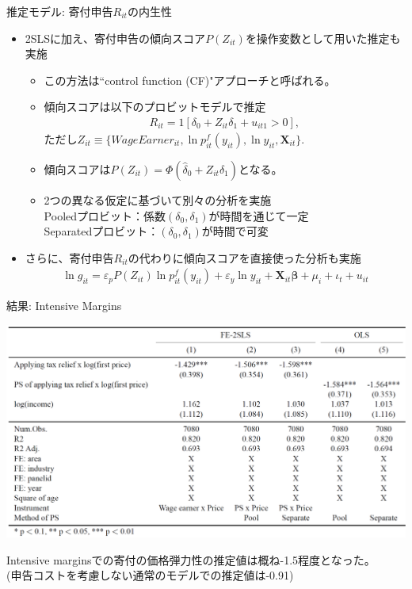 \documentclass[dvipdfmx,10pt]{beamer}
\begin{document}
\begin{frame}{推定モデル: 寄付申告$R_{it}$の内生性}
	\begin{itemize}
		\item 2SLSに加え、寄付申告の傾向スコア$P(Z_{it})$を操作変数として用いた推定も実施
		\begin{itemize}
			\item この方法は``control function (CF)"アプローチと呼ばれる。
			\item 傾向スコアは以下のプロビットモデルで推定
			\begin{align}
				R_{it}=1[\delta_0+Z_{it}\delta_1+u_{it1}>0]\tag{8},
			\end{align}
			ただし$Z_{it}\equiv \{WageEarner_{it}, \ln p_{it}^f(y_{it}), \ln y_{it}, \bm{X}_{it}\}$.
			\item 傾向スコアは$P(Z_{it})=\Phi(\hat{\delta}_0+Z_{it}\hat{\delta}_1)$となる。
			\item 2つの異なる仮定に基づいて別々の分析を実施\\
			  Pooledプロビット：係数$(\delta_0, \delta_1)$が時間を通じて一定\\
			  Separatedプロビット：$(\delta_0, \delta_1)$が時間で可変
		\end{itemize}
		\item さらに、寄付申告$R_{it}$の代わりに傾向スコアを直接使った分析も実施
		\begin{align}
			\ln g_{it} = \varepsilon_pP(Z_{it})\ln p_{it}^f(y_{it}) + \varepsilon_y \ln y_{it} + \bm{X}_{it}\bm{\beta} + \mu_i + \iota_t + u_{it}\tag{9}
		\end{align}
	\end{itemize}
\end{frame}

\begin{frame}{結果: Intensive Margins}
	\begin{table}
		\centering
		\includegraphics[width=0.9\linewidth]{Tab_res_1}
		\caption{First-Price Elasticities (Intensive Margins)}
		\label{tab:2}
	\end{table}
Intensive marginsでの寄付の価格弾力性の推定値は概ね-1.5程度となった。\\
(申告コストを考慮しない通常のモデルでの推定値は-0.91)
\end{frame}
\end{document}
